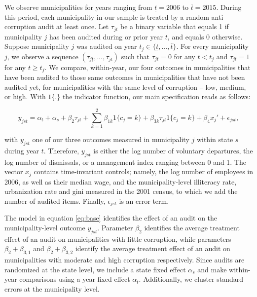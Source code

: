 We observe municipalities for years ranging from $\underline{t} = 2006$ to $\overline{t} = 2015$. During this period, each municipality in our sample is treated by a random anti-corruption audit at least once. Let $\tau_{jt}$ be a binary variable that equals 1 if municipality $j$ has been audited during or prior year $t$, and equals 0 otherwise. Suppose municipality $j$ was audited on year $t_j \in \{\underline{t}, ..., \overline{t}\}$. For every municipality $j$, we observe a sequence $(\tau_{j\underline{t}}, ..., \tau_{j\overline{t}})$ such that $\tau_{jt} = 0$ for any $t < t_j$ and $\tau_{jt} = 1$ for any $t \geq t_j$. We compare, within-year, our four outcomes in municipalities that have been audited to those same outcomes in municipalities that have not been audited yet, for municipalities with the same level of corruption -- low, medium, or high. With $1\{.\}$ the indicator function, our main specification reads as follows: 

\begin{equation}
    y_{jst} = \alpha_t + \alpha_s + \beta_2 \tau_{jt} + \sum_{k=1}^2 \beta_{1k} 1\{c_j = k\} +  \beta_{3k} \tau_{jt} 1\{c_j = k\} + \beta_4 x_j' + \epsilon_{jst}, 
    \label{eq:base}
\end{equation}

with $y_{jst}$ one of our three outcomes measured in municipality $j$ within state $s$ during year $t$. Therefore, $y_{jst}$ is either the log number of voluntary departures, the log number of dismissals, or a management index ranging between 0 and 1. The vector $x_j$ contains time-invariant controls; namely, the log number of employees in 2006, as well as their median wage, and the municipality-level illiteracy rate, urbanization rate and gini measured in the 2001 census, to which we add the number of audited items. Finally, $\epsilon_{jst}$ is an error term. 

The model in equation \ref{eq:base} identifies the effect of an audit on the municipality-level outcome $y_{jst}$. Parameter $\beta_2$ identifies the average treatment effect of an audit on municipalities with little corruption, while parameters $\beta_2 + \beta_{3,1}$ and $\beta_2 + \beta_{3,2}$ identify the average treatment effect of an audit on municipalities with moderate and high corruption respectively. Since audits are randomized at the state level, we include a state fixed effect $\alpha_s$ and make within-year comparisons using a year fixed effect $\alpha_t$. Additionally, we cluster standard errors at the municipality level. 

